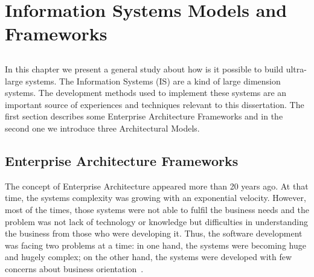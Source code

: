 \chapter{Information Systems Models and Frameworks} \label{chap:inf-sys}

\section*{}

%


%
%
%
%

In this chapter we present a general study about how is it possible to build ultra-large systems. The Information Systems (IS) are a kind of large dimension systems. The development methods used to implement these systems are an important source of experiences and techniques relevant to this dissertation. The first section describes some Enterprise Architecture Frameworks and in the second one we introduce three Architectural Models.


\section{Enterprise Architecture Frameworks} \label{sec:ea-frams}
The concept of Enterprise Architecture appeared more than 20 years ago. At that time, the systems complexity was growing with an exponential velocity. However, most of the times, those systems were not able to fulfil the business needs and the problem was not lack of technology or knowledge but difficulties in understanding the business from those who were developing it. Thus, the software development was facing two problems at a time: in one hand, the systems were becoming huge and hugely complex; on the other hand, the systems were developed with few concerns about business orientation~\citep{Sessions2007}.

